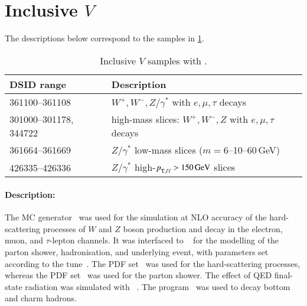\section[Inclusive Powheg \(V\)]{Inclusive \POWHEG \(V\)}

The descriptions below correspond to the samples in \cref{tab:v-powheg}.

\begin{table}[!htbp]
  \caption{Inclusive \(V\) samples with \POWHEG.}%
  \label{tab:v-powheg}
  \centering
  \begin{tabular}{l l}
    \toprule
    DSID range & Description \\
    \midrule
    361100--361108    & \(W^+,W^-,Z/\gamma^\ast\) with \(e,\mu,\tau\) decays\\
    301000--301178, 344722    & high-mass slices: \(W^+,W^-,Z\) with \(e,\mu,\tau\) decays \\
    361664--361669 & \(Z/\gamma^\ast\) low-mass slices (\(m=6\)--10--60\,\si{\GeV})\\
    426335--426336 & \(Z/\gamma^\ast\) high-\(\pTX[][\ell\ell] > \SI{150}{\GeV}\) slices \\
    \bottomrule
  \end{tabular}
\end{table}

\paragraph{Description:}

The \POWHEGBOX[v1] MC generator~\cite{Nason:2004rx,Frixione:2007vw,Alioli:2010xd,Alioli:2008gx}
was used for the simulation at NLO accuracy of the hard-scattering processes of \(W\)
and \(Z\) boson production and decay in the electron, muon, and \(\tau\)-lepton
channels. It was interfaced to \PYTHIA[8.186]~\cite{Sjostrand:2007gs}
for the modelling of the parton shower, hadronisation, and underlying
event, with parameters set according to the \AZNLO
tune~\cite{STDM-2012-23}. The \CT[10nlo] PDF set~\cite{Lai:2010vv} was used
for the hard-scattering processes, whereas the \CTEQ[6L1] PDF
set~\cite{Pumplin:2002vw} was used for the parton shower. The effect of
QED final-state radiation was simulated with \PHOTOSpp[3.52]~\cite{Golonka:2005pn,Davidson:2010ew}.
The \EVTGEN[1.2.0] program~\cite{Lange:2001uf} was used to decay bottom and charm hadrons.


